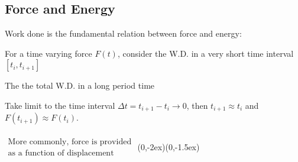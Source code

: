 \documentclass[class=article, crop=false, 12pt]{standalone}
\begin{document}
\subsection{Force and Energy}

Work done is the fundamental relation between force and energy:

For a time varying force $F(t)$, consider the W.D. in a very short time interval $[t_i, t_{i+1}]$

The the total W.D. in a long period time 

Take limit to the time interval $\Delta t = t_{i+1}-t_i \to 0$, then $t_{i+1}\approx t_i$ and $F(t_{i+1})\approx F(t_i)$.
\\\\
{$\substack{\displaystyle\text{More commonly, force is provided} \\ \displaystyle\text{as a function of displacement}}$}
{(0,-2ex)}{(0,-1.5ex)}
\end{document}
